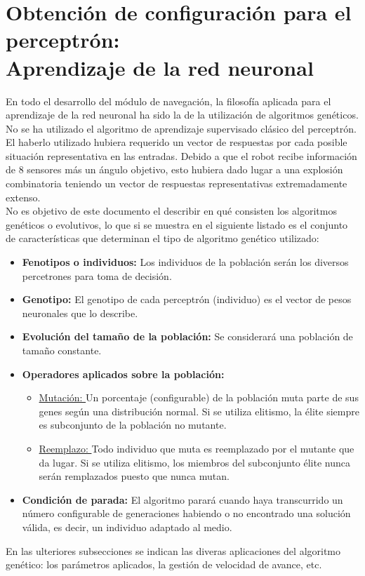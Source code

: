 \documentclass[12pt,spanish]{article}
\begin{document}
\section{Obtención de configuración para el perceptrón:\\Aprendizaje de la red neuronal}
En todo el desarrollo del módulo de navegación, la filosofía aplicada para el aprendizaje de la red neuronal ha sido la de la utilización de algoritmos genéticos. No se ha utilizado el algoritmo de aprendizaje supervisado clásico del perceptrón. El haberlo utilizado hubiera requerido un vector de respuestas por cada posible situación representativa en las entradas. Debido a que el robot recibe información de 8 sensores más un ángulo objetivo, esto hubiera dado lugar a una explosión combinatoria teniendo un vector de respuestas representativas extremadamente extenso.\\
No es objetivo de este documento el describir en qué consisten los algoritmos genéticos o evolutivos, lo que si se muestra en el siguiente listado es el conjunto de características que determinan el tipo de algoritmo genético utilizado:\\
\begin{itemize}
	\item{\textbf{Fenotipos o individuos:} Los individuos de la población serán los diversos percetrones para toma de decisión.}
	\item{\textbf{Genotipo:} El genotipo de cada perceptrón (individuo) es el vector de pesos neuronales que lo describe.}
	\item{\textbf{Evolución del tamaño de la población: }} Se considerará una población de tamaño constante.
	\item{\textbf{Operadores aplicados sobre la población:} }
		\begin{itemize}
			\item{\underline{Mutación: }} Un porcentaje (configurable) de la población muta parte de sus genes según una distribución normal. Si se utiliza elitismo, la élite siempre es subconjunto de la población no mutante.
			\item{\underline{Reemplazo: }} Todo individuo que muta es reemplazado por el mutante que da lugar. Si se utiliza elitismo, los miembros del subconjunto élite nunca serán remplazados puesto que nunca mutan. 
		\end{itemize}
	\item{\textbf{Condición de parada:} } El algoritmo parará cuando haya transcurrido un número configurable de generaciones habiendo o no encontrado una solución válida, es decir, un individuo adaptado al medio.
\end{itemize}  
En las ulteriores subsecciones se indican las diveras aplicaciones del algoritmo genético: los parámetros aplicados, la gestión de velocidad de avance, etc. 
\end{document}
